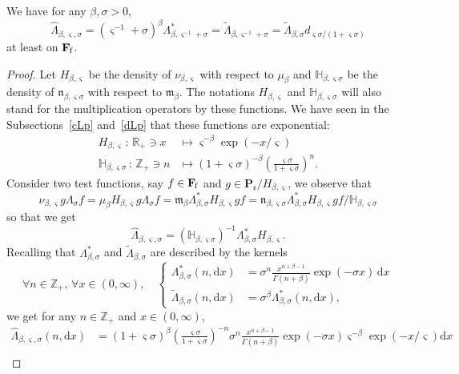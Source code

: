 \documentclass[AHL,Unicode,longabstracts]{cedram}
\newcommand{\RR}{\mathbb{R}}
\newcommand{\ZZ}{\mathbb{Z}}
\newcommand{\fe}{\mathfrak{e}}
\newcommand{\fm}{\mathfrak{m}}
\newcommand{\fn}{\mathfrak{n}}
\newcommand{\iy}{\infty}
\newcommand{\lt}{\left}
\newcommand{\rt}{\right}
\newcommand{\wi}{\widetilde}
\newcommand{\wit}{\widehat}
\newcommand{\st}{\,:\,}
\newcommand{\esP}{\mathbf{P}}
\newcommand{\esF}{\mathbf{F}}
\newcommand{\esPe}{\esP_{\! \fe}}
\newcommand{\esFf}{\esF_{\hskip-.3mm\mathrm{f}}}
\newcommand{\discret}[1]{\mathds{#1}}
\let\oldforall\forall
\renewcommand*{\forall}{\mathrel{\oldforall}}
\newcommand*{\dd}{\mathrm{d}}
\newcommand*{\dx}{\dd x}
\begin{document}
\begin{lemm}\label{differentsadjoints}
We have for any $\beta,\sigma> 0$,
\[
\wit \Lambda_{\beta,\varsigma,\sigma}=\lt(\varsigma^{-1}+\sigma\rt)^\beta \Lambda_{\beta,\varsigma^{-1}+\sigma}^{*}=\wi \Lambda_{\beta,\varsigma^{-1}+\sigma}=\wi \Lambda_{\beta,\sigma}d_{\varsigma\sigma/(1+\varsigma\sigma)}
\]
at least on $\esFf$.
\end{lemm}

\begin{proof}
Let $H_{\beta,\varsigma}$ be the density of $\nu_{\beta,\varsigma}$ with respect to $\mu_{\beta}$ and $\discret{H}_{\beta,\varsigma\sigma}$ be the density of $\fn_{\beta,\varsigma\sigma}$ with respect to $\fm_{\beta}$. The notations $H_{\beta,\varsigma}$ and $\discret{H}_{\beta,\varsigma\sigma}$ will also stand for the multiplication operators by these functions. We have seen in the Subsections~\ref{cLp} and~\ref{dLp} that these functions are exponential:
\begin{align*}
H_{\beta,\varsigma}\st \RR_+\ni x&\mapsto \varsigma^{-\beta}\exp(-x/\varsigma)\\
\discret{H}_{\beta,\varsigma\sigma}\st \ZZ_+\ni n&\mapsto(1+\varsigma\sigma)^{-\beta} \lt(\frac{\varsigma\sigma}{1+\varsigma\sigma}\rt)^n.
\end{align*}
Consider two test functions, say $f\in\esFf$ and $g\in\esPe/H_{\beta,\varsigma}$, we observe that
\[
\nu_{\beta,\varsigma} g\Lambda_{\sigma}f=\mu_{\beta}H_{\beta,\varsigma}g\Lambda_{\sigma}f =\fm_{\beta}\Lambda_{\beta,\sigma}^*H_{\beta,\varsigma}gf =\fn_{\beta,\varsigma\sigma}\Lambda_{\beta,\sigma}^* H_{\beta,\varsigma}gf/\discret{H}_{\beta,\varsigma\sigma}
\]
so that we get
\[
\wit \Lambda_{\beta,\varsigma,\sigma}=(\discret{H}_{\beta,\varsigma\sigma})^{-1}\Lambda_{\beta,\sigma}^*H_{\beta,\varsigma}.
\]
Recalling that $\Lambda_{\beta,\sigma}^*$ and $\wi \Lambda_{\beta,\sigma}$ are described by the kernels
\begin{equation}\label{eq:def_Ladj}
\forall n\in\ZZ_+,\,\forall x\in(0,\iy),\quad\lt\{
\begin{aligned}
\Lambda_{\beta,\sigma}^*(n,\dx)&= \sigma^n\tfrac{x^{n+\beta-1}}{\Gamma(n+\beta)}\exp(-\sigma x)\, \dx\\
\wi \Lambda_{\beta,\sigma}(n,\dx)&= \sigma^\beta\Lambda_{\beta,\sigma}^*(n,\dx),
\end{aligned}\rt.
\end{equation}
we get for any $n\in\ZZ_+$ and $ x\in(0,\iy)$,
\begin{align*}
\wit \Lambda_{\beta,\varsigma,\sigma}(n,\dx)&= (1+\varsigma\sigma)^\beta\lt(\frac{\varsigma\sigma}{1+\varsigma\sigma}\rt)^{-n}\sigma^n\frac{x^{n+\beta-1}}{\Gamma(n+\beta)} \exp(-\sigma x)\varsigma^{-\beta}\exp(-x/\varsigma)\dx\\

\end{align*}
\end{proof}
\end{document}
